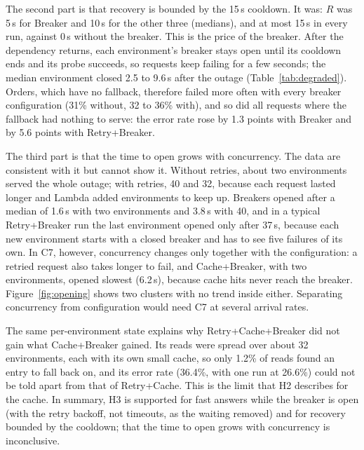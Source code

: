 \documentclass[10pt]{article}
\begin{document}
The second part is that recovery is bounded by the 15\,s cooldown. It was: $R$
was 5\,s for Breaker and 10\,s for the other three (medians), and at most 15\,s
in every run, against 0\,s without the breaker. This is the price of the
breaker. After the dependency returns, each environment's breaker stays open
until its cooldown ends and its probe succeeds, so requests keep failing for a
few seconds; the median environment closed 2.5 to 9.6\,s after the outage
(Table~\ref{tab:degraded}). Orders, which have no fallback, therefore failed
more often with every breaker configuration (31\% without, 32 to 36\% with),
and so did all requests where the fallback had nothing to serve: the error rate
rose by 1.3 points with Breaker and by 5.6 points with Retry+Breaker.

The third part is that the time to open grows with concurrency. The data are
consistent with it but cannot show it. Without retries, about two environments
served the whole outage; with retries, 40 and 32, because each request lasted
longer and Lambda added environments to keep up. Breakers opened after a median
of 1.6\,s with two environments and 3.8\,s with 40, and in a typical
Retry+Breaker run the last environment opened only after 37\,s, because each
new environment starts with a closed breaker and has to see five failures of
its own. In C7, however, concurrency changes only together with the
configuration: a retried request also takes longer to fail, and Cache+Breaker,
with two environments, opened slowest (6.2\,s), because cache hits never reach
the breaker. Figure~\ref{fig:opening} shows two clusters with no trend inside
either. Separating concurrency from configuration would need C7 at several
arrival rates.

The same per-environment state explains why Retry+Cache+Breaker did not gain
what Cache+Breaker gained. Its reads were spread over about 32 environments,
each with its own small cache, so only 1.2\% of reads found an entry to fall
back on, and its error rate (36.4\%, with one run at 26.6\%) could not be told
apart from that of Retry+Cache. This is the limit that H2 describes for the
cache. In summary, H3 is supported for fast answers while the breaker is open
(with the retry backoff, not timeouts, as the waiting removed) and for recovery
bounded by the cooldown; that the time to open grows with concurrency is
inconclusive.
\end{document}
